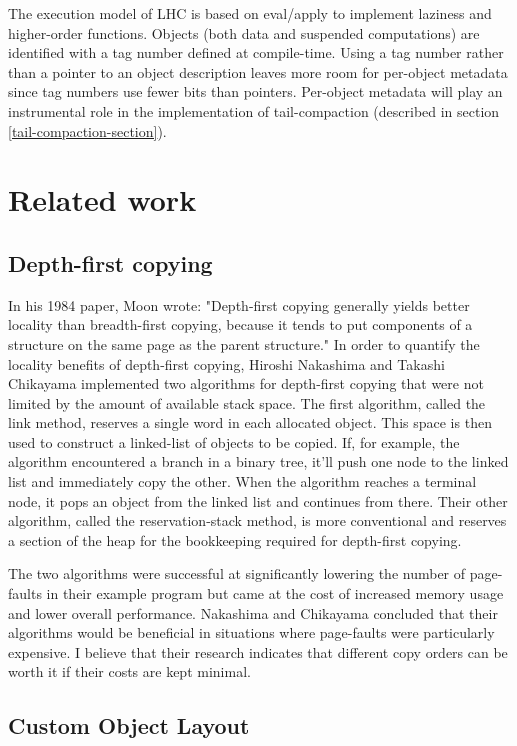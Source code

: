 \documentclass[a4paper,oneside]{memoir}
\begin{document}
The execution model of LHC is based on eval/apply\cite{evalapply} to implement
laziness and higher-order functions. Objects (both data and suspended computations)
are identified with a tag number defined at compile-time. Using a tag number
rather than a pointer to an object description leaves more room for per-object
metadata since tag numbers use fewer bits than pointers. Per-object metadata
will play an instrumental role in the implementation of tail-compaction (described
in section \ref{tail-compaction-section}).

\section{Related work}
\subsection{Depth-first copying}

In his 1984 paper, Moon wrote: "Depth-first copying generally yields better locality than
breadth-first copying, because it tends to put components of a structure on the
same page as the parent structure."
\cite{Moon:1984}
In order to quantify the locality benefits of depth-first copying,
Hiroshi Nakashima and Takashi Chikayama implemented two algorithms for depth-first
copying that were not limited by the amount of available stack space.\cite{Nakashima}
The first
algorithm, called the link method, reserves a single word in each allocated
object. This space is then used to construct a linked-list of objects to be copied.
If, for example, the algorithm encountered a branch in a binary tree, it'll push
one node to the linked list and immediately copy the other. When the algorithm
reaches a terminal node, it pops an object from the linked list and continues
from there.
Their other algorithm, called the reservation-stack method, is more conventional
and reserves a section of the heap for the bookkeeping required for depth-first
copying.

The two algorithms were successful at significantly lowering the number of
page-faults in their example program but came at the cost of increased memory
usage and lower overall performance. Nakashima and Chikayama concluded that
their algorithms would be beneficial in situations where page-faults were
particularly expensive. I believe that their research indicates that different
copy orders can be worth it if their costs are kept minimal.

\subsection{Custom Object Layout}
\end{document}
